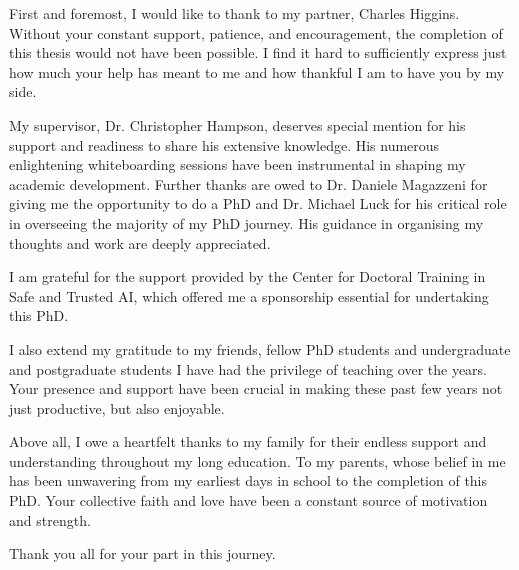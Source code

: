 \documentclass[12pt]{muthesis}
\theoremstyle{definition}
\begin{document}

First and foremost, I would like to thank to my partner, Charles Higgins. Without your constant support, patience, and encouragement, the completion of this thesis would not have been possible. I find it hard to sufficiently express just how much your help has meant to me and how thankful I am to have you by my side.

\noindent
My supervisor, Dr. Christopher Hampson, deserves special mention for his support and readiness to share his extensive knowledge. His numerous enlightening whiteboarding sessions have been instrumental in shaping my academic development. Further thanks are owed to Dr. Daniele Magazzeni for giving me the opportunity to do a PhD and Dr. Michael Luck for his critical role in overseeing the majority of my PhD journey. His guidance in organising my thoughts and work are deeply appreciated.

\noindent
I am grateful for the support provided by the Center for Doctoral Training in Safe and Trusted AI, which offered me a sponsorship essential for undertaking this PhD.

\noindent
I also extend my gratitude to my friends, fellow PhD students and undergraduate and postgraduate students I have had the privilege of teaching over the years. Your presence and support have been crucial in making these past few years not just productive, but also enjoyable. 

\noindent
Above all, I owe a heartfelt thanks to my family for their endless support and understanding throughout my long education. To my parents, whose belief in me has been unwavering from my earliest days in school to the completion of this PhD. Your collective faith and love have been a constant source of motivation and strength.

\noindent
Thank you all for your part in this journey.
\contentspage










% 


% 
% 
% 




\appendix



\end{document}
